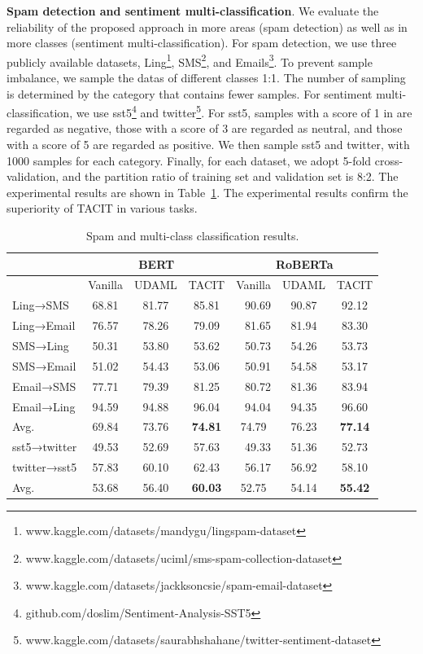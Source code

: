 \documentclass[letterpaper]{article} %
\begin{document}
\textbf{Spam detection and sentiment multi-classification}. We evaluate the reliability of the proposed approach in more areas (spam detection) as well as in more classes (sentiment multi-classification). For spam detection, we use three publicly available datasets, Ling\footnote{www.kaggle.com/datasets/mandygu/lingspam-dataset}, SMS\footnote{www.kaggle.com/datasets/uciml/sms-spam-collection-dataset}, and Emails\footnote{www.kaggle.com/datasets/jackksoncsie/spam-email-dataset}. To prevent sample imbalance, we sample the datas of different classes 1:1. The number of sampling is determined by the category that contains fewer samples. For sentiment multi-classification, we use sst5\footnote{github.com/doslim/Sentiment-Analysis-SST5} and twitter\footnote{www.kaggle.com/datasets/saurabhshahane/twitter-sentiment-dataset}. For sst5, samples with a score of 1 in are regarded as negative, those with a score of 3 are regarded as neutral, and those with a score of 5 are regarded as positive. We then sample sst5 and twitter, with 1000 samples for each category. Finally, for each dataset, we adopt 5-fold cross-validation, and the partition ratio of training set and validation set is 8:2. The experimental results are shown in Table~\ref{tab:a2}. The experimental results confirm the superiority of TACIT in various tasks. 

\begin{table}[htbp]
	\renewcommand{\arraystretch}{0.9}
	\setlength\tabcolsep{0.1mm}
	\centering
	\begin{tabular}{lccc|ccc} \hline \hline
		& \multicolumn{3}{c}{BERT} & \multicolumn{3}{c}{RoBERTa} \\ \hline
		& \multicolumn{1}{l}{Vanilla} & UDAML  & \multicolumn{1}{l}{TACIT} & \multicolumn{1}{l}{Vanilla} & UDAML  & TACIT \\ \hline
		Ling→SMS & 68.81 & 81.77 & 85.81 & \multicolumn{1}{r}{90.69} & 90.87 & 92.12 \\
		Ling→Email & 76.57 & 78.26 & 79.09 & \multicolumn{1}{r}{81.65} & 81.94 & 83.30 \\
		SMS→Ling & 50.31 & 53.80 & 53.62 & \multicolumn{1}{r}{50.73} & 54.26 & 53.73 \\
		SMS→Email & 51.02 & 54.43 & 53.06 & \multicolumn{1}{r}{50.91} & 54.58 & 53.17 \\
		Email→SMS & 77.71 & 79.39 & 81.25 & \multicolumn{1}{r}{80.72} & 81.36 & 83.94 \\
		Email→Ling & 94.59 & 94.88 & 96.04 & \multicolumn{1}{r}{94.04} & 94.35 & 96.60 \\ \hline
		Avg.  & 69.84 & 73.76 & \textbf{74.81} & 74.79 & 76.23 & \textbf{77.14} \\ \hline \hline
		sst5→twitter & 49.53 & 52.69 & 57.63 & \multicolumn{1}{r}{49.33} & 51.36 & 52.73 \\
		twitter→sst5 & 57.83 & 60.10  & 62.43 & \multicolumn{1}{r}{56.17} & 56.92 & 58.10 \\ \hline
		Avg.  & 53.68 & 56.40  & \textbf{60.03} & 52.75 & 54.14 & \textbf{55.42} \\ \hline \hline
	\end{tabular}%
	\caption{Spam and multi-class classification results. }
	\label{tab:a2}%
\end{table}%
\end{document}
